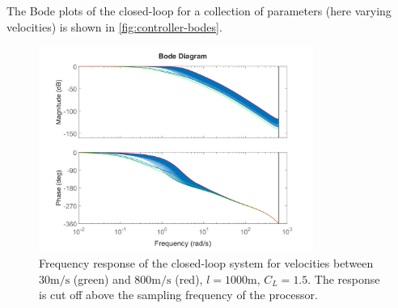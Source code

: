 The Bode plots of the closed-loop for a collection of parameters (here varying velocities) is shown in \autoref{fig:controller-bodes}.

\begin{figure}[ht!]
    \centering
    \includegraphics[width=0.8\textwidth]{images-design/controller_bodes.png}
    \caption[Closed-loop frequency response]{Frequency response of the closed-loop system for velocities between $30\mathrm{m/s}$ (green) and $800\mathrm{m/s}$ (red), $l=1000\mathrm{m}$, $C_L = 1.5$.
    The response is cut off above the sampling frequency of the processor.}
    \label{fig:controller-bodes}
\end{figure}



